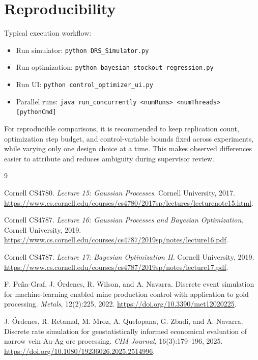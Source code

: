 \documentclass[11pt]{article}
\begin{document}
\section{Reproducibility}
Typical execution workflow:
\begin{itemize}
	\item Run simulator: \texttt{python DRS\_Simulator.py}
	\item Run optimization: \texttt{python bayesian\_stockout\_regression.py}
	\item Run UI: \texttt{python control\_optimizer\_ui.py}
	\item Parallel runs: \texttt{java run\_concurrently <numRuns> <numThreads> [pythonCmd]}
\end{itemize}

For reproducible comparisons, it is recommended to keep replication count, optimization step budget, and control-variable bounds fixed across experiments, while varying only one design choice at a time. This makes observed differences easier to attribute and reduces ambiguity during supervisor review.

\begin{thebibliography}{9}

Cornell CS4780.
\newblock \emph{Lecture 15: Gaussian Processes}.
\newblock Cornell University, 2017.
\newblock \url{https://www.cs.cornell.edu/courses/cs4780/2017sp/lectures/lecturenote15.html}.

Cornell CS4787.
\newblock \emph{Lecture 16: Gaussian Processes and Bayesian
Optimization}.
\newblock Cornell University, 2019.
\newblock \url{https://www.cs.cornell.edu/courses/cs4787/2019sp/notes/lecture16.pdf}.

Cornell CS4787.
\newblock \emph{Lecture 17: Bayesian Optimization II}.
\newblock Cornell University, 2019.
\newblock \url{https://www.cs.cornell.edu/courses/cs4787/2019sp/notes/lecture17.pdf}.

F. Pe{\~n}a-Graf, J. {\'O}rdenes, R. Wilson, and A. Navarra.
\newblock Discrete event simulation for machine-learning enabled mine production control with application to gold processing.
\newblock \emph{Metals}, 12(2):225, 2022.
\newblock \url{https://doi.org/10.3390/met12020225}.

J. {\'O}rdenes, R. Retamal, M. Mroz, A. Quelopana, G. Zbadi, and A. Navarra.
\newblock Discrete rate simulation for geostatistically informed economical evaluation of narrow vein Au-Ag ore processing.
\newblock \emph{CIM Journal}, 16(3):179--196, 2025.
\newblock \url{https://doi.org/10.1080/19236026.2025.2514996}.

\end{thebibliography}
\end{document}
